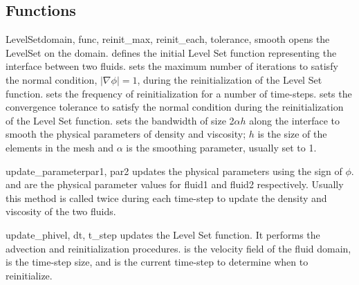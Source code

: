 \subsection{Functions}

\begin{classdesc}{LevelSet}{domain, func, reinit\_max, reinit\_each, tolerance, smooth}
opens the LevelSet  on the \Domain domain.  defines the initial Level Set function representing the interface between two fluids.  sets the maximum number of iterations to satisfy the normal condition, $|\nabla \phi|=1$, during the reinitialization of the Level Set function.  sets the frequency of reinitialization for a number of time-steps.  sets the convergence tolerance to satisfy the normal condition during the reinitialization of the Level Set function.  sets the bandwidth of size 2$\alpha h$ along the interface to smooth the physical parameters of density and viscosity; $h$ is the size of the elements in the mesh and $\alpha$ is the smoothing parameter, usually set to 1.
\end{classdesc}

\begin{methoddesc}[LevelSet]{update\_parameter}{par1, par2}
updates the physical parameters using the sign of $\phi$.  and  are the physical parameter values for fluid1 and fluid2 respectively. Usually this method is called twice during each time-step to update the density and viscosity of the two fluids.
\end{methoddesc}

\begin{methoddesc}[LevelSet]{update\_phi}{vel,  dt, t\_step}
updates the Level Set function. It performs the advection and reinitialization procedures.  is the velocity field of the fluid domain,  is the time-step size, and  is the current time-step to determine when to reinitialize.
\end{methoddesc}
